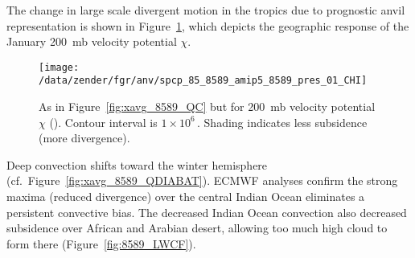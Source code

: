 \documentclass[twoside,agupp]{aguplus}
\begin{document}
The change in large scale divergent motion in the tropics due to
prognostic anvil representation is shown in
Figure~\ref{fig:pres_8589_01_CHI}, which depicts the geographic
response of the January 200~mb velocity potential $\chi$. 
\begin{figure}
\begin{center}
\texttt{[image: /data/zender/fgr/anv/spcp\_85\_8589\_amip5\_8589\_pres\_01\_CHI]}\vfill
\end{center}
\caption{
As in Figure~\ref{fig:xavg_8589_QC} but for 200~mb velocity potential
$\chi$ (\mSxs). 
Contour interval is $1 \times 10^6$\,\mSxs.  
Shading indicates less subsidence (more divergence). 
\label{fig:pres_8589_01_CHI}}   
\end{figure}
Deep convection shifts toward the winter hemisphere
(cf.\ Figure~\ref{fig:xavg_8589_QDIABAT}).
ECMWF analyses confirm the strong maxima (reduced divergence) over the
central Indian Ocean eliminates a persistent convective bias. 
The decreased Indian Ocean convection also decreased subsidence over
African and Arabian desert, allowing too much high cloud to form there
(Figure~\ref{fig:8589_LWCF}). 
\end{document}
